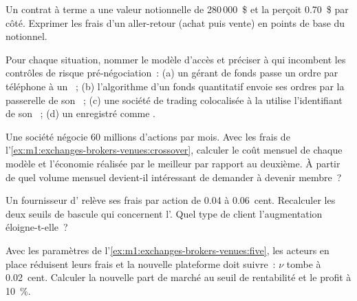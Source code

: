 \begin{exercise}[$\star$]\label{exo:m1:exchanges-brokers-venues:2}
Un contrat à terme a une valeur notionnelle de 280\,000~\$ et la  perçoit
0.70~\$ par côté. Exprimer les frais d'un aller-retour (achat puis vente) en points
de base du notionnel.
\end{exercise}

\begin{exercise}[$\star$]\label{exo:m1:exchanges-brokers-venues:3}
Pour chaque situation, nommer le modèle d'accès et préciser à qui incombent les contrôles
de risque pré-négociation~: (a) un gérant de fonds passe un ordre par téléphone à un ~; (b)
l'algorithme d'un fonds quantitatif envoie ses ordres par la passerelle de son ~;
(c) une société de trading colocalisée à la  utilise l'identifiant de son ~;
(d) un  enregistré comme .
\end{exercise}

\begin{exercise}[$\star\star$]\label{exo:m1:exchanges-brokers-venues:4}
Une société négocie 60 millions d'actions par mois. Avec les frais de
l'\cref{ex:m1:exchanges-brokers-venues:crossover}, calculer le coût mensuel de
chaque modèle et l'économie réalisée par le meilleur par rapport au deuxième. À partir de quel
volume mensuel devient-il intéressant de demander à devenir membre~?
\end{exercise}

\begin{exercise}[$\star\star$]\label{exo:m1:exchanges-brokers-venues:5}
Un fournisseur d' relève ses frais par action de 0.04 à
0.06~cent. Recalculer les deux seuils de bascule qui concernent l'. Quel type
de client l'augmentation éloigne-t-elle~?
\end{exercise}

\begin{exercise}[$\star\star$]\label{exo:m1:exchanges-brokers-venues:6}
Avec les paramètres de l'\cref{ex:m1:exchanges-brokers-venues:five}, les
acteurs en place réduisent leurs frais et la nouvelle plateforme doit suivre~: $\nu$ tombe à
0.02~cent. Calculer la nouvelle part de marché au seuil de rentabilité et le profit à 10~\%.
\end{exercise}

